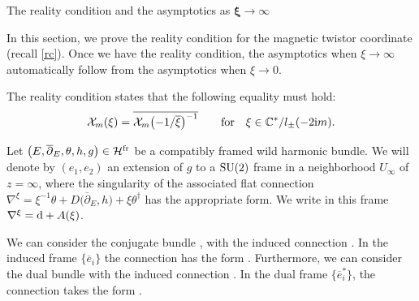 \begin{subsubsection}{The reality condition and the asymptotics as $\boldsymbol{\xi \to \infty}$}

In this section, we prove the reality condition for the magnetic twistor coordinate (recall \eqref{rc}). Once we have the reality condition, the asymptotics when $\xi \to \infty$ automatically follow from the asymptotics when $\xi \to 0$.

The reality condition states that the following equality must hold:
\begin{equation*}
\mathcal{X}_m(\xi)=\overline{\mathcal{X}_m\bigl(-1/\overline{\xi}\bigr)^{-1}} \qquad \text{for} \quad \xi \in \mathbb{C
 }^*/l_{\pm}(-2{\rm i}m).
\end{equation*}

Let $\bigl(E,\overline{\partial}_E, \theta, h,g\bigr) \in \mathcal{H}^{{\rm fr}}$ be a compatibly framed wild harmonic bundle. We will denote by $(e_1,e_2)$ an extension of $g$ to a ${\rm SU}(2)$ frame in a neighborhood $U_{\infty}$ of $z=\infty$, where the singularity of the associated flat connection $\nabla^{\xi}=\xi^{-1}\theta + D\bigl(\overline{\partial}_E,h\bigr) + \xi \theta^{\dagger}$ has the appropriate form. We write in this frame $\nabla^{\xi}={\rm d}+A(\xi)$.

We can consider the conjugate bundle , with the induced connection \smash{$\overline{\nabla^{\xi}}$}. In the induced frame $\{\overline{e}_i\}$ the connection has the form . Furthermore, we can consider the dual bundle  with the induced connection \smash{$\overline{\nabla^{\xi}}^*$}. In the dual frame $\{\overline{e}^*_i\}$, the connection \smash{$\overline{\nabla^{\xi}}^{*}$} takes the form .


\end{subsubsection}
